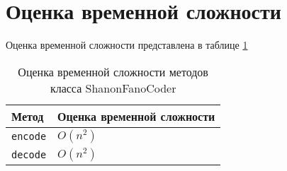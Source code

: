 \section{Оценка временной сложности}

Оценка временной сложности представлена в таблице \ref{tab:complexity}

\begin{table}[H]
    \centering
    \begin{tabular}{|l|l|}
        \hline
        Метод & Оценка временной сложности \\
        \hline
        \verb|encode| & $ O(n^2) $ \\
        \hline
        \verb|decode| & $ O(n^2) $ \\
        \hline
    \end{tabular}
    \caption{Оценка временной сложности методов класса ShanonFanoCoder}
    \label{tab:complexity}
\end{table}
